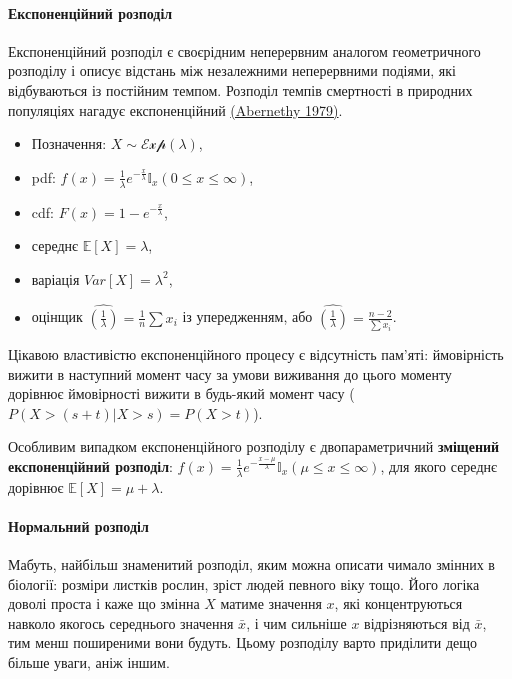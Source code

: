 \documentclass[
  11pt,
]{book}
\begin{document}
\paragraph{Експоненційний розподіл}\label{ux435ux43aux441ux43fux43eux43dux435ux43dux446ux456ux439ux43dux438ux439-ux440ux43eux437ux43fux43eux434ux456ux43b}

Експоненційний розподіл є своєрідним неперервним аналогом геометричного розподілу і описує відстань між незалежними неперервними подіями, які відбуваються із постійним темпом. Розподіл темпів смертності в природних популяціях нагадує експоненційний \href{https://doi.org/10.1016/0022-5193(79)90098-5}{(Abernethy 1979)}.

\begin{itemize}
\item
  Позначення: \(X \sim \mathcal{Exp}(\lambda)\),
\item
  pdf: \(f(x) = \frac{1}{\lambda} e^{-\frac{x}{\lambda}} \mathbb{I}_x (0 \leq x \leq \infty)\),
\item
  cdf: \(F(x) = 1 - e^{-\frac{x}{\lambda}}\),
\item
  середнє \(\mathbb{E} [X] = \lambda\),
\item
  варіація \(Var[X] = \lambda^2\),
\item
  оцінщик \(\hat{(\frac{1}{\lambda})} = \frac{1}{n} \sum x_i\) із упередженням, або \(\hat{(\frac{1}{\lambda})} = \frac{n-2}{\sum x_i}\).
\end{itemize}

Цікавою властивістю експоненційного процесу є відсутність пам'яті: ймовірність вижити в наступний момент часу за умови виживання до цього моменту дорівнює ймовірності вижити в будь-який момент часу (\(P(X > (s+t)|X > s) = P(X > t)\)).

Особливим випадком експоненційного розподілу є двопараметричний \textbf{зміщений експоненційний розподіл}: \(f(x) = \frac{1}{\lambda} e^{-\frac{x - \mu}{\lambda}} \mathbb{I}_x (\mu \leq x \leq \infty)\), для якого середнє дорівнює \(\mathbb{E}[X] = \mu + \lambda\).

\paragraph{Нормальний розподіл}\label{ux43dux43eux440ux43cux430ux43bux44cux43dux438ux439-ux440ux43eux437ux43fux43eux434ux456ux43b}

Мабуть, найбільш знаменитий розподіл, яким можна описати чимало змінних в біології: розміри листків рослин, зріст людей певного віку тощо. Його логіка доволі проста і каже що змінна \(X\) матиме значення \(x\), які концентруються навколо якогось середнього значення \(\bar{x}\), і чим сильніше \(x\) відрізняються від \(\bar{x}\), тим менш поширеними вони будуть. Цьому розподілу варто приділити дещо більше уваги, аніж іншим.
\end{document}
